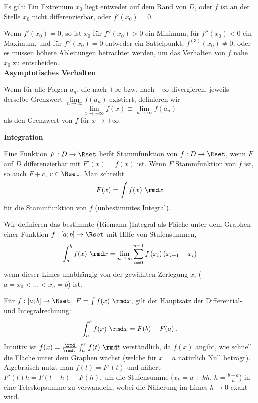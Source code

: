 \documentclass[a4paper,10pt]{article}
\begin{document}
Es gilt: Ein Extremum $x_0$ liegt entweder auf dem Rand von $D$, oder
$f$ ist an der Stelle $x_0$ nicht differenzierbar, oder $f'(x_0)=0$.

Wenn $f'(x_0)=0$, so ist $x_0$ für $f''(x_0)>0$ ein Minimum,
für $f''(x_0)<0$ ein Maximum, und für $f''(x_0)=0$ entweder ein Sattelpunkt,
$f^{(3)}(x_0)\not=0$, oder es müssen höhere Ableitungen betrachtet werden,
um das Verhalten von $f$ nahe $x_0$ zu entscheiden.\\

{\bf Asymptotisches Verhalten}

Wenn für alle Folgen $a_n$, die nach $+\infty$ bzw. nach $-\infty$ divergieren,
jeweils derselbe Grenzwert $\lim\limits_{n\to\infty} f(a_n)$ existiert,
definieren wir
\[
\lim\limits_{x\to\pm\infty} f(x)\equiv \lim\limits_{n\to\infty} f(a_n)
\]
als den Grenzwert von $f$ für $x\to\pm\infty$.

\pagebreak

{\bf Integration}

Eine Funktion $F:D\to\Rset$ heißt Stammfunktion von $f:D\to\Rset$, wenn
$F$ auf $D$ differenzierbar mit $F'(x)=f(x)$ ist.
Wenn $F$ Stammfunktion von $f$ ist, so auch $F+c$, $c\in\Rset$.
Man schreibt
\[
F(x) = \int f(x)~\rmd x
\]
für die Stammfunktion von $f$ (unbestimmtes Integral).

Wir definieren das bestimmte (Riemann-)Integral als Fläche unter dem
Graphen einer Funktion $f:[a;b]\to\Rset$ mit Hilfe von Stufensummen,
\[
\int_a^b f(x)~\rmd x = \lim\limits_{n\to\infty}\sum_{i=0}^{n-1}f\left(x_i\right)(x_{i+1}-x_i)
\]
wenn dieser Limes unabhängig von der gewählten Zerlegung
$x_i$ ($a=x_0<\ldots<x_n=b$) ist.


Für $f:[a;b]\to\Rset$, $F=\int f(x)~\rmd x$, gilt der Hauptsatz der
Differential- und Integralrechnung:
\[
\int_a^b f(x)~\rmd x = F(b)-F(a)\,.
\]
Intuitiv ist $f(x)=\frac{\rmd}{\rmd x}\int_a^x f(t)~\rmd t$ verständlich,
da $f(x)$ angibt, wie schnell die Fläche unter dem Graphen wächst
(welche für $x=a$ natürlich Null beträgt).
Algebraisch nutzt man $f(t)=F'(t)$ und nähert $F'(t)h=F(t+h)-F(h)$,
um die Stufensumme ($x_k=a+kh$, $h=\frac{b-a}{n}$)
in eine Teleskopsumme zu verwandeln, wobei die Näherung
im Limes $h\to 0$ exakt wird.
\end{document}
